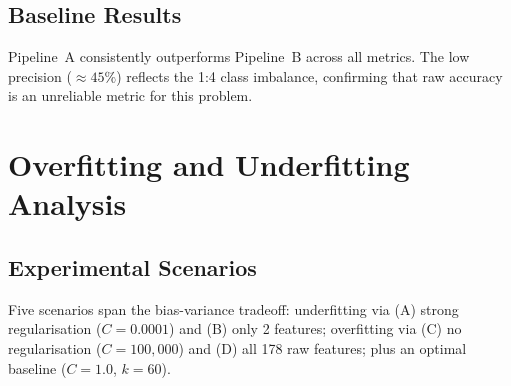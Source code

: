 \documentclass[conference]{IEEEtran}
\begin{document}
\subsection{Baseline Results}

\begin{table}[H]
  \centering
  \caption{Baseline Logistic Regression --- Validation and Test Metrics}
  \label{tab:baseline}
\end{table}

Pipeline~A consistently outperforms Pipeline~B across all metrics.
The low precision (${\approx}45\%$) reflects the 1:4 class imbalance,
confirming that raw accuracy is an unreliable metric for this problem.

\section{Overfitting and Underfitting Analysis}
\label{sec:overfit}

\subsection{Experimental Scenarios}

Five scenarios span the bias-variance tradeoff:
underfitting via (A) strong regularisation ($C{=}0.0001$) and
(B) only 2 features; overfitting via (C) no regularisation
($C{=}100{,}000$) and (D) all 178 raw features; plus an optimal
baseline ($C{=}1.0$, $k{=}60$).
\end{document}
